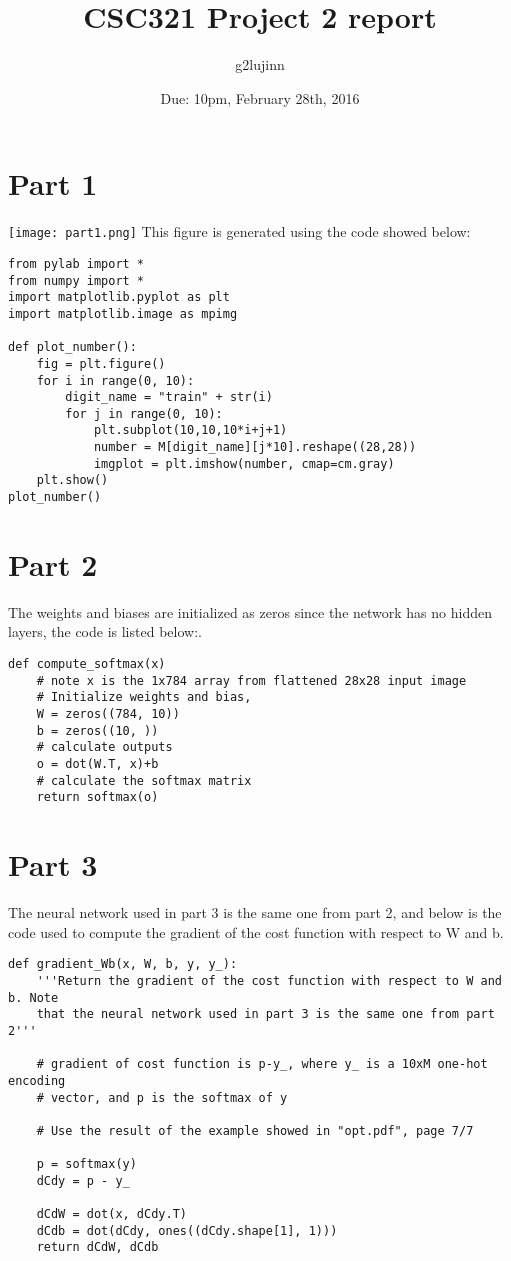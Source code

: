 \documentclass{article}
\title{CSC321 Project 2 report}
\author{g2lujinn }
\date{Due: 10pm, February 28th, 2016}
\begin{document}
\maketitle

\section*{Part 1}
\texttt{[image: part1.png]}
\indent \indent \indent This figure is generated using the code showed below:\\
\begin{lstlisting}
from pylab import *
from numpy import *
import matplotlib.pyplot as plt
import matplotlib.image as mpimg

def plot_number():
    fig = plt.figure()
    for i in range(0, 10):
        digit_name = "train" + str(i)
        for j in range(0, 10):
            plt.subplot(10,10,10*i+j+1)
            number = M[digit_name][j*10].reshape((28,28))
            imgplot = plt.imshow(number, cmap=cm.gray)
    plt.show()
plot_number()
\end{lstlisting}
\section*{Part 2}
The weights and biases are initialized as zeros since the network has no hidden layers, the code is listed below:.\\
\begin{lstlisting}
def compute_softmax(x)
	# note x is the 1x784 array from flattened 28x28 input image
  	# Initialize weights and bias, 
  	W = zeros((784, 10))
 	b = zeros((10, ))
  	# calculate outputs
 	o = dot(W.T, x)+b
  	# calculate the softmax matrix
  	return softmax(o)
\end{lstlisting}
\section*{Part 3}
The neural network used in part 3 is the same one from part 2, and below is the code used to compute the gradient of the cost function with respect to W and b.
\begin{lstlisting}
def gradient_Wb(x, W, b, y, y_):
    '''Return the gradient of the cost function with respect to W and b. Note
    that the neural network used in part 3 is the same one from part 2'''

    # gradient of cost function is p-y_, where y_ is a 10xM one-hot encoding
    # vector, and p is the softmax of y

    # Use the result of the example showed in "opt.pdf", page 7/7

    p = softmax(y)
    dCdy = p - y_

    dCdW = dot(x, dCdy.T)
    dCdb = dot(dCdy, ones((dCdy.shape[1], 1)))
    return dCdW, dCdb

\end{lstlisting}
\end{document}
